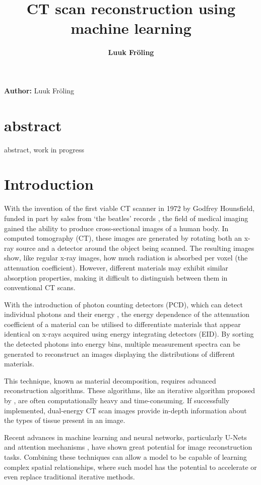 \documentclass{article}
\title{CT scan reconstruction using machine learning}
\date{\displaydate{articleDate}}
\author{\bfseries Luuk Fröling\mdseries\\}
\begin{document}
\maketitle

\textbf{Author:} Luuk Fröling

\section{abstract}

abstract, work in progress

\section{Introduction}

With the invention of the first viable CT scanner in 1972 by Godfrey Hounsfield, funded in part by sales from `the beatles' records \citep{pietzsch2025ct}, the field of medical imaging gained the ability to produce cross-sectional images of a human body. In computed tomography (CT), these images are generated by rotating both an x-ray source and a detector around the object being scanned. The resulting images show, like regular x-ray images, how much radiation is absorbed per voxel (the attenuation coefficient). However, different materials may exhibit similar absorption properties, making it difficult to distinguish between them in conventional CT scans.

With the introduction of photon counting detectors (PCD), which can detect individual photons and their energy \citep{taguchi2013photon}, the energy dependence of the attenuation coefficient of a material can be utilised to differentiate materials that appear identical on x-rays acquired using energy integrating detectors (EID). By sorting the detected photons into energy bins, multiple measurement spectra can be generated to reconstruct an images displaying the distributions of different materials.

This technique, known as material decomposition, requires advanced reconstruction algorithms. These algorithms, like an iterative algorithm proposed by \citep{mechlem2018joint}, are often computationally heavy and time-consuming. If successfully implemented, dual-energy CT scan images provide in-depth information about the types of tissue present in an image.

Recent advances in machine learning and neural networks, particularly U-Nets \citep{oktay2018attentionunet} and attention mechanisms  \citep{vaswani2017attention}, have shown great potential for image reconstruction tasks. Combining these techniques can allow a model to be capable of learning complex spatial relationships, where such model has the potential to accelerate or even replace traditional iterative methods.
\end{document}
